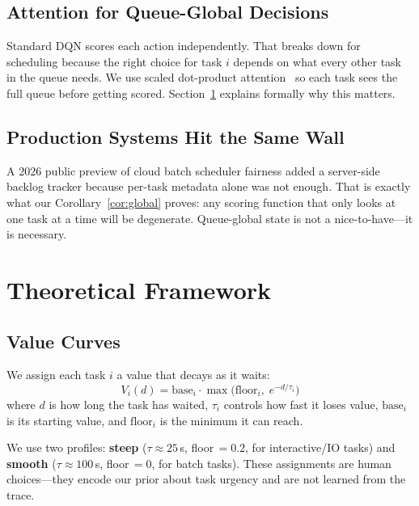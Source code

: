 \documentclass[10pt,twocolumn]{article}
\theoremstyle{remark}
\begin{document}
\subsection{Attention for Queue-Global Decisions}

Standard DQN scores each action independently. That breaks down for
scheduling because the right choice for task $i$ depends on what
every other task in the queue needs. We use scaled dot-product
attention~\cite{vaswani2017} so each task sees the full queue before
getting scored. Section~\ref{sec:theory} explains formally why this
matters.

\subsection{Production Systems Hit the Same Wall}

A 2026 public preview of cloud batch scheduler fairness added a
server-side backlog tracker because per-task metadata alone was not
enough. That is exactly what our Corollary~\ref{cor:global} proves:
any scoring function that only looks at one task at a time will be
degenerate. Queue-global state is not a nice-to-have---it is
necessary.

\section{Theoretical Framework}
\label{sec:theory}

\subsection{Value Curves}

We assign each task $i$ a value that decays as it waits:
\begin{equation}
  V_i(d) = \mathrm{base}_i \cdot
  \max\!\bigl(\mathrm{floor}_i,\; e^{-d/\tau_i}\bigr)
  \label{eq:vcurve}
\end{equation}
where $d$ is how long the task has waited, $\tau_i$ controls how
fast it loses value, $\mathrm{base}_i$ is its starting value, and
$\mathrm{floor}_i$ is the minimum it can reach.

We use two profiles: \textbf{steep} ($\tau\approx25$\,s,
floor$\,=0.2$, for interactive/IO tasks) and \textbf{smooth}
($\tau\approx100$\,s, floor$\,=0$, for batch tasks). These
assignments are human choices---they encode our prior about task
urgency and are not learned from the trace.
\end{document}
